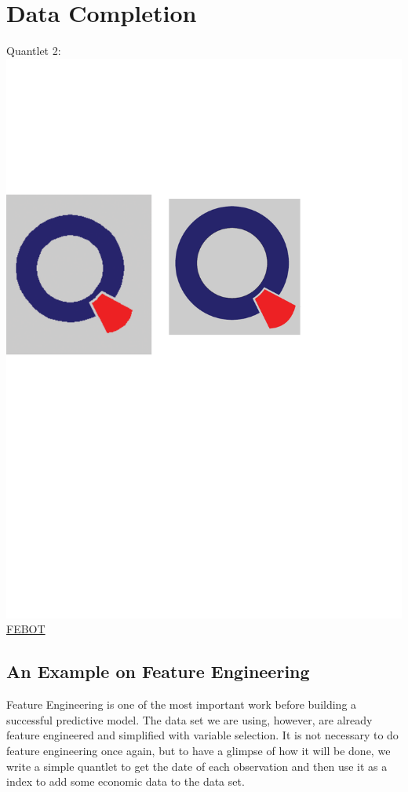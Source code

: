 \documentclass[12pt, a4paper, bibliography=totoc, english]{scrartcl}
\begin{document}
\section{Data Completion}\label{Dc}
Quantlet 2:\includegraphics[scale=0.08]{qletlogo}
\textcolor{blue}{\href{https://github.com/JingyiLiu3136/MLFBM/tree/master/FEBOT}{FEBOT}}\\
\subsection{An Example on Feature Engineering}
Feature Engineering is one of the most important work before building a successful predictive model. The data set we are using, however, are already feature engineered and simplified with variable selection. It is not necessary to do feature engineering once again, but to have a glimpse of how it will be done, we write a simple quantlet to get the date of each observation and then use it as a index to add some economic data to the data set.
\end{document}

